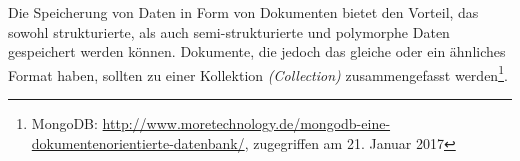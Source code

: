 Die Speicherung von Daten in Form von Dokumenten bietet den Vorteil, das sowohl strukturierte, als auch semi-strukturierte und polymorphe Daten gespeichert werden können. Dokumente, die jedoch das gleiche oder ein ähnliches Format haben, sollten zu einer Kollektion \textit{(Collection)} zusammengefasst werden\footnote{MongoDB: \url{http://www.moretechnology.de/mongodb-eine-dokumentenorientierte-datenbank/}, zugegriffen am 21. Januar 2017}.

%



